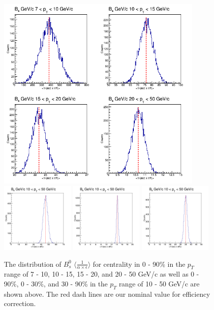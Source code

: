 \begin{figure}[h]
\begin{center}
\includegraphics[width= 0.90\textwidth]{Figures/Chapter5/BsStatSyst_0_90_4BinsPT.png}
\includegraphics[width= 0.32\textwidth]{Figures/Chapter5/BsStatSyst_0_30_1BinsPT.png}
\includegraphics[width= 0.32\textwidth]{Figures/Chapter5/BsStatSyst_30_90_1BinsPT.png}
\includegraphics[width= 0.32\textwidth]{Figures/Chapter5/BsStatSyst_0_90_1BinsPT.png}
\caption{The distribution of $B^0_s$ $\langle \frac{1}{\alpha \times \epsilon} \rangle$ for centrality in 0 - 90\% in the $p_T$ range of 7 - 10, 10 - 15, 15 - 20, and 20 - 50 GeV/c as well as 0 - 90\%, 0 - 30\%, and 30 - 90\% in the $p_T$ range of 10 - 50 GeV/c are shown above. The red dash lines are our nominal value for efficiency correction.}
\label{BsEffStatSyst}
\end{center}
\end{figure}


